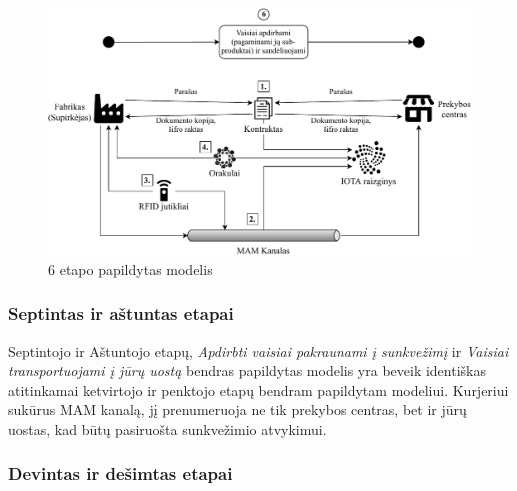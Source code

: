 \begin{figure}[H]
    \centering
    \includegraphics[scale=0.7]{images/iota-usecase-6}
    \caption{6 etapo papildytas modelis}
\end{figure}




\subsubsection{Septintas ir aštuntas etapai}

Septintojo ir Aštuntojo etapų, \textit{Apdirbti vaisiai pakraunami į sunkvežimį} ir \textit{Vaisiai transportuojami į jūrų uostą} bendras papildytas modelis yra beveik identiškas atitinkamai ketvirtojo ir penktojo etapų bendram papildytam modeliui. Kurjeriui sukūrus MAM kanalą, jį prenumeruoja ne tik prekybos centras, bet ir jūrų uostas, kad būtų pasiruošta sunkvežimio atvykimui.




\subsubsection{Devintas ir dešimtas etapai}

